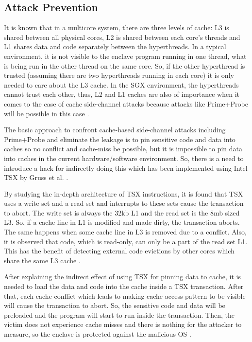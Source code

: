 \subsection{Attack Prevention}%
It is known that in a multicore system, there are three levels of cache: L3 is shared between all physical cores, L2 is shared between each core's threads and L1 shares data and code separately between the hyperthreads. In a typical environment, it is not visible to the enclave program running in one thread, what is being run in the other thread on the same core. So, if the other hyperthread is trusted (assuming there are two hyperthreads running in each core) it is only needed to care about the L3 cache. In the SGX environment, the hyperthreads cannot trust each other, thus, L2 and L1 caches are also of importance when it comes to the case of cache side-channel attacks because attacks like Prime+Probe will be possible in this case \cite{cloak}.

The basic approach to confront cache-based side-channel attacks including Prime+Probe and eliminate the leakage is to pin sensitive code and data into caches so no conflict and cache-miss be possible, but it is impossible to pin data into caches in the current hardware/software environment. So, there is a need to introduce a hack for indirectly doing this which has been implemented using Intel TSX by Gruss et al. \cite{cloak}.

By studying the in-depth architecture of TSX instructions, it is found that TSX uses a write set and a read set and interrupts to these sets cause the transaction to abort. The write set is always the 32kb L1 and the read set is the 8mb sized L3. So, if a cache line in L1 is modified and made dirty, the transaction aborts. The same happens when some cache line in L3 is removed due to a conflict. Also, it is observed that code, which is read-only, can only be a part of the read set L1. This has the benefit of detecting external code evictions by other cores which share the same L3 cache \cite{cloak}.

After explaining the indirect effect of using TSX for pinning data to cache, it is needed to load the data and code into the cache inside a TSX transaction. After that, each cache conflict which leads to making cache access pattern to be visible will cause the transaction to abort. So, the sensitive code and data will be preloaded and the program will start to run inside the transaction. Then, the victim does not experience cache misses and there is nothing for the attacker to measure, so the enclave is protected against the malicious OS \cite{cloak}.

